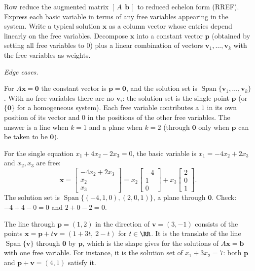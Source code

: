 \documentclass[10pt]{scrartcl}
\newcommand{\vv}[1]{\mathbf{#1}}
\DeclareMathOperator{\spn}{Span}
\begin{document}
\begin{steps}
  \ii Row reduce the augmented matrix $[\,A\ \ \vv b\,]$ to reduced echelon form (RREF).
  \ii Express each basic variable in terms of any free variables appearing in the system.
  \ii Write a typical solution $\vv x$ as a column vector whose entries depend linearly on the free variables.
  \ii Decompose $\vv x$ into a constant vector $\vv p$ (obtained by setting all free variables to $0$) plus a linear combination of vectors $\vv v_1,\dots,\vv v_k$ with the free variables as weights.
\end{steps}
\emph{Edge cases.}
\begin{itemize}
  \ii For $A\vv x=\vv 0$ the constant vector is $\vv p=\vv 0$, and the solution set is $\spn\{\vv v_1,\dots,\vv v_k\}$.
  \ii With no free variables there are no $\vv v_i$: the solution set is the single point $\vv p$ (or $\{\vv 0\}$ for a homogeneous system).
  \ii Each free variable contributes a $1$ in its own position of its vector and $0$ in the positions of the other free variables.
  \ii The answer is a line when $k=1$ and a plane when $k=2$ (through $\vv 0$ only when $\vv p$ can be taken to be $\vv 0$).
\end{itemize}

\begin{example*}
For the single equation $x_1+4x_2-2x_3=0$, the basic variable is $x_1=-4x_2+2x_3$ and $x_2,x_3$ are free:
\[
  \vv x=\begin{bmatrix}-4x_2+2x_3\\x_2\\x_3\end{bmatrix}
  =x_2\begin{bmatrix}-4\\1\\0\end{bmatrix}+x_3\begin{bmatrix}2\\0\\1\end{bmatrix}.
\]
The solution set is $\spn\{(-4,1,0),(2,0,1)\}$, a plane through $\vv 0$. Check: $-4+4-0=0$ and $2+0-2=0$.
\end{example*}

\begin{example*}
The line through $\vv p=(1,2)$ in the direction of $\vv v=(3,-1)$ consists of the points $\vv x=\vv p+t\vv v=(1+3t,\ 2-t)$ for $t\in\RR$. It is the translate of the line $\spn\{\vv v\}$ through $\vv 0$ by $\vv p$, which is the shape  gives for the solutions of $A\vv x=\vv b$ with one free variable. For instance, it is the solution set of $x_1+3x_2=7$: both $\vv p$ and $\vv p+\vv v=(4,1)$ satisfy it.
\end{example*}
\end{document}
